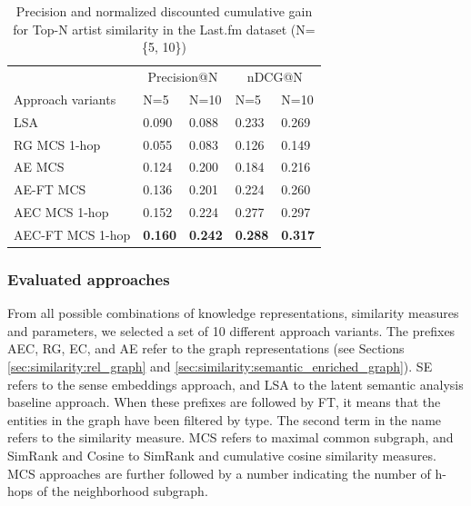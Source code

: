 \begin{table}
\small
\centering
	\begin{tabular}{ lllll }
 	\toprule
	& \multicolumn{2}{c}{Precision@N} & \multicolumn{2}{c}{nDCG@N} \\
\cmidrule(lr){2-3}
 \cmidrule(lr){4-5}
	Approach variants & N=5 & N=10 & N=5 & N=10 \\
	\midrule
LSA & 0.090 & 0.088 & 0.233 & 0.269 \\
RG MCS 1-hop & 0.055 & 0.083 & 0.126 & 0.149 \\
AE MCS & 0.124 & 0.200 & 0.184 & 0.216 \\
AE-FT MCS & 0.136 & 0.201 & 0.224 & 0.260 \\
AEC MCS 1-hop & 0.152 & 0.224 & 0.277 & 0.297 \\
AEC-FT MCS 1-hop & \textbf{0.160} & \textbf{0.242} & \textbf{0.288} & \textbf{0.317} \\
\bottomrule
	\end{tabular}
	\caption[Precision and nDCG for Top-N artist similarity in the Last.fm dataset.]{Precision and normalized discounted cumulative gain for Top-N artist similarity in the Last.fm dataset (N=\{5, 10\})}	
	\label{tbl:similarity:res_lastfm}
\end{table}

\subsubsection{Evaluated approaches}\label{sec:similarity:eval_approaches} %

From all possible combinations of knowledge representations, similarity measures and parameters, we selected a set of 10 different approach variants. The prefixes AEC, RG, EC, and AE refer to the graph representations (see Sections \ref{sec:similarity:rel_graph} and \ref{sec:similarity:semantic_enriched_graph}). %
SE refers to the sense embeddings approach, and LSA to the latent semantic analysis baseline approach. When these prefixes are followed by FT, it means that the entities in the graph have been filtered by type. The second term in the name refers to the similarity measure. MCS refers to maximal common subgraph, and SimRank and Cosine to SimRank and cumulative cosine similarity measures. MCS approaches are further followed by a number indicating the number of h-hops of the neighborhood subgraph.


